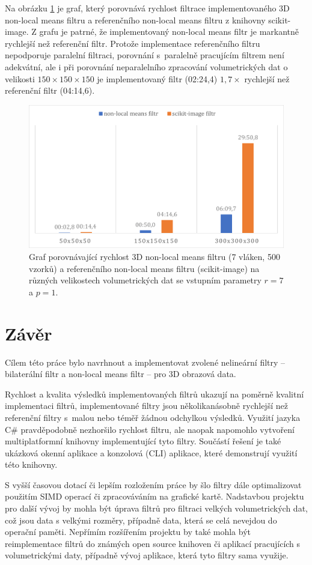 Na obrázku \ref{fig:results:3dnlm} je graf, který porovnává rychlost filtrace implementovaného 3D non-local means filtru a referenčního non-local means filtru z knihovny scikit-image. Z grafu je patrné, že implementovaný non-local means filtr je markantně rychlejší než referenční filtr. Protože implementace referenčního filtru nepodporuje paralelní filtraci, porovnání s~paralelně pracujícím filtrem není adekvátní, ale i při porovnání neparalelního zpracování volumetrických dat o velikosti $150\times150\times150$ je implementovaný filtr (02:24,4) $1,7\times$ rychlejší než referenční filtr (04:14,6).

\begin{figure} [H]
    \centering
    \label{fig:results:3dnlm}
    \includegraphics[width=1\textwidth]{figures/3dnlm.pdf}
    \caption{Graf porovnávající rychlost 3D non-local means filtru (7 vláken, 500 vzorků) a referenčního non-local means filtru (scikit-image) na různých velikostech volumetrických dat se vstupním parametry $r=7$ a $p=1$.}
\end{figure}

\chapter{Závěr}
\label{chap:conclusion}
Cílem této práce bylo navrhnout a implementovat zvolené nelineární filtry -- bilaterální filtr a non-local means filtr -- pro 3D obrazová data.

Rychlost a kvalita výsledků implementovaných filtrů ukazují na poměrně kvalitní implementaci filtrů, implementované filtry jsou několikanásobně rychlejší než referenční filtry s~malou nebo téměř žádnou odchylkou výsledků. Využití jazyka C\# pravděpodobně nezhoršilo rychlost filtru, ale naopak napomohlo vytvoření multiplatformní knihovny implementující tyto filtry. Součástí řešení je také ukázková okenní aplikace a konzolová (CLI) aplikace, které demonstrují využití této knihovny. 

S vyšší časovou dotací či lepším rozložením práce by šlo filtry dále optimalizovat použitím SIMD operací či zpracováváním na grafické kartě. Nadstavbou projektu pro další vývoj by mohla být úprava filtrů pro filtraci velkých volumetrických dat, což jsou data s velkými rozměry, případně data, která se celá nevejdou do operační paměti.
Nepřímím rozšířením projektu by také mohla být reimplementace filtrů do známých open source knihoven či aplikací pracujících s volumetrickými daty, případně vývoj aplikace, která tyto filtry sama využije. 